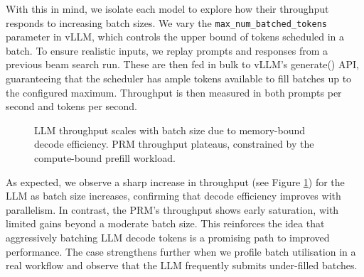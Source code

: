 \documentclass[11pt,twoside]{report}
\begin{document}
With this in mind, we isolate each model to explore how their throughput responds to increasing batch sizes. 
We vary the \texttt{max\_num\_batched\_tokens} parameter in vLLM, which controls the upper bound of tokens scheduled in a batch. 
To ensure realistic inputs, we replay prompts and responses from a previous beam search run. 
These are then fed in bulk to vLLM's generate() API, guaranteeing that the scheduler has ample tokens available to fill batches up to the configured maximum. 
Throughput is then measured in both prompts per second and tokens per second.

\begin{figure}[htbp]
\centering
{}
\hfill
{}
\caption{LLM throughput scales with batch size due to memory-bound decode efficiency. PRM throughput plateaus, constrained by the compute-bound prefill workload.}
\label{fig:prm_throughput_vs_llm_throughput}
\end{figure}

As expected, we observe a sharp increase in throughput (see Figure \ref{fig:prm_throughput_vs_llm_throughput}) for the LLM as batch size increases, confirming that decode efficiency improves with parallelism. 
In contrast, the PRM's throughput shows early saturation, with limited gains beyond a moderate batch size. 
This reinforces the idea that aggressively batching LLM decode tokens is a promising path to improved performance. 
The case strengthens further when we profile batch utilisation in a real workflow and observe that the LLM frequently submits under-filled batches.
\end{document}
